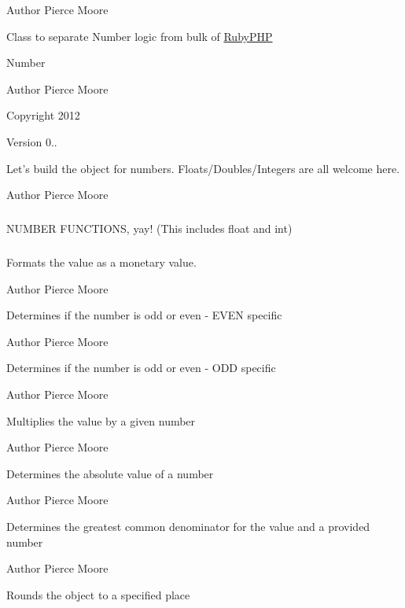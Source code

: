 \begin{DoxyAuthor}{Author}
Pierce Moore
\end{DoxyAuthor}
Class to separate Number logic from bulk of \hyperlink{namespace_ruby_p_h_p}{Ruby\-P\-H\-P}

Number \begin{DoxyAuthor}{Author}
Pierce Moore 
\end{DoxyAuthor}
\begin{DoxyCopyright}{Copyright}
2012 
\end{DoxyCopyright}
\begin{DoxyVersion}{Version}
0..
\end{DoxyVersion}
Let's build the object for numbers. Floats/\-Doubles/\-Integers are all welcome here.

\begin{DoxyAuthor}{Author}
Pierce Moore
\end{DoxyAuthor}
\subparagraph*{}

\begin{DoxyVerb}                   NUMBER FUNCTIONS, yay! (This includes float and int)\end{DoxyVerb}
 \subparagraph*{}

Formats the value as a monetary value.

\begin{DoxyAuthor}{Author}
Pierce Moore
\end{DoxyAuthor}
Determines if the number is odd or even -\/ E\-V\-E\-N specific

\begin{DoxyAuthor}{Author}
Pierce Moore
\end{DoxyAuthor}
Determines if the number is odd or even -\/ O\-D\-D specific

\begin{DoxyAuthor}{Author}
Pierce Moore
\end{DoxyAuthor}
Multiplies the value by a given number

\begin{DoxyAuthor}{Author}
Pierce Moore
\end{DoxyAuthor}
Determines the absolute value of a number

\begin{DoxyAuthor}{Author}
Pierce Moore
\end{DoxyAuthor}
Determines the greatest common denominator for the value and a provided number

\begin{DoxyAuthor}{Author}
Pierce Moore
\end{DoxyAuthor}
Rounds the object to a specified place

